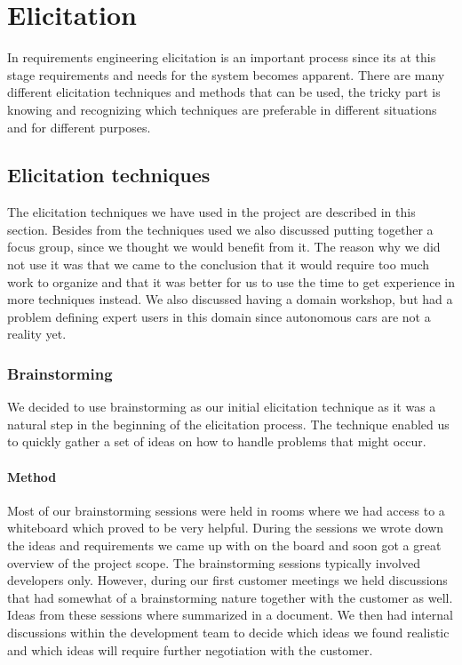 \documentclass[10pt]{article}
\begin{document}
\section{Elicitation}
\sloppy
\noindent
In requirements engineering elicitation is an important process since its at this stage requirements and needs for the system becomes apparent. There are many different elicitation techniques and methods that can be used, the tricky part is knowing and recognizing which techniques are preferable in different situations and for different purposes.

\subsection{Elicitation techniques}
The elicitation techniques we have used in the project are described in this section. Besides from the techniques used we also discussed putting together a focus group, since we thought we would benefit from it. The reason why we did not use it was that we came to the conclusion that it would require too much work to organize and that it was better for us to use the time to get experience in more techniques instead. We also discussed having a domain workshop, but had a problem defining expert users in this domain since autonomous cars are not a reality yet.

\subsubsection{Brainstorming}
We decided to use brainstorming as our initial elicitation technique as it was a natural step in the beginning of the elicitation process. The technique enabled us to quickly gather a set of ideas on how to handle problems that might occur.

\paragraph{Method}
\hfill \break
Most of our brainstorming sessions were held in rooms where we had access to a whiteboard which proved to be very helpful. During the sessions we wrote down the ideas and requirements we came up with on the board and soon got a great overview of the project scope. The brainstorming sessions typically involved developers only. However, during our first customer meetings we held discussions that had somewhat of a brainstorming nature together with the customer as well. Ideas from these sessions where summarized in a document. We then had internal discussions within the development team to decide which ideas we found realistic and which ideas will require further negotiation with the customer.
\end{document}

